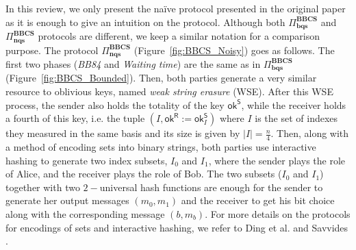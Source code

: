 In this review, we only present the na\"ive protocol presented in the original paper \cite{KWW12} as it is enough to give an intuition on the protocol. Although both $\Pi^{\textbf{BBCS}}_{\textbf{bqs}}$ and $\Pi^{\textbf{BBCS}}_{\textbf{nqs}}$ protocols are different, we keep a similar notation for a comparison purpose. The protocol $\Pi^{\textbf{BBCS}}_{\textbf{nqs}}$ (Figure~\ref{fig:BBCS_Noisy}) goes as follows. The first two phases (\textit{BB84} and \textit{Waiting time}) are the same as in $\Pi^{\textbf{BBCS}}_{\textbf{bqs}}$ (Figure~\ref{fig:BBCS_Bounded}). Then, both parties generate a very similar resource to oblivious keys, named \textit{weak string erasure} (WSE). After this WSE process, the sender also holds the totality of the key $\mathsf{ok}^{\mathsf{S}}$, while the receiver holds a fourth of this key, i.e. the tuple $(I, \mathsf{ok}^{\mathsf{R}} := \mathsf{ok}^{\mathsf{S}}_I)$ where $I$ is the set of indexes they measured in the same basis and its size is given by $|I| = \frac{n}{4}$. Then, along with a method of encoding sets into binary strings, both parties use interactive hashing to generate two index subsets, $I_0$ and $I_1$, where the sender plays the role of Alice, and the receiver plays the role of Bob. The two subsets ($I_0$ and $I_1$) together with two $2-$universal hash functions are enough for the sender to generate her output messages $(m_0, m_1)$ and the receiver to get his bit choice along with the corresponding message $(b, m_b)$. For more details on the protocols for encodings of sets and interactive hashing, we refer to Ding et al. \cite{DHRS04} and Savvides \cite{S07}.

